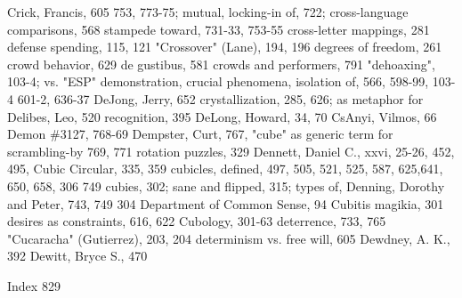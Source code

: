 Crick, Francis, 605                                753, 773-75; mutual, locking-in of, 722;
cross-language comparisons, 568                    stampede toward, 731-33, 753-55
cross-letter mappings, 281                        defense spending, 115, 121
"Crossover" (Lane), 194, 196                      degrees of freedom, 261
crowd behavior, 629                               de gustibus, 581
crowds and performers, 791                        "dehoaxing", 103-4; vs. "ESP" demonstration,
crucial phenomena, isolation of, 566, 598-99,      103-4
 601-2, 636-37                                    DeJong, Jerry, 652
crystallization, 285, 626; as metaphor for        Delibes, Leo, 520
 recognition, 395                                 DeLong, Howard, 34, 70
CsAnyi, Vilmos, 66                                Demon \#3127, 768-69 Dempster, Curt, 767,
"cube" as generic term for scrambling-by           769, 771
 rotation puzzles, 329                            Dennett, Daniel C., xxvi, 25-26, 452, 495,
Cubic Circular, 335, 359 cubicles, defined,        497, 505, 521, 525, 587, 625,641, 650, 658,
 306                                               749
cubies, 302; sane and flipped, 315; types of,     Denning, Dorothy and Peter, 743, 749
 304                                              Department of Common Sense, 94
Cubitis magikia, 301                              desires as constraints, 616, 622
Cubology, 301-63                                  deterrence, 733, 765
"Cucaracha" (Gutierrez), 203, 204                 determinism vs. free will, 605
                                                  Dewdney, A. K., 392 Dewitt, Bryce S., 470

 Index                                                                                       829

